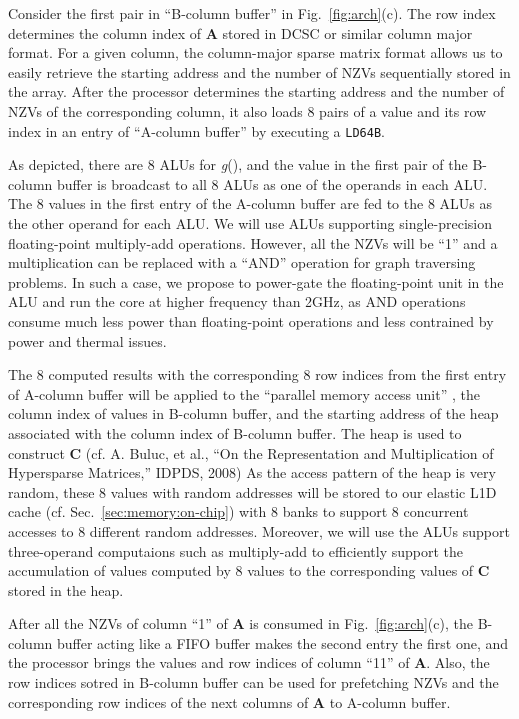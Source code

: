 Consider the first pair in ``B-column buffer'' in Fig.~\ref{fig:arch}(c).
The row index determines the column index of \textbf{A} stored in DCSC or similar column major format.
For a given column, the column-major sparse matrix format allows us to easily retrieve the starting address and the number of NZVs sequentially stored in the array. 
After the processor determines the starting address and the number of NZVs of the corresponding column, 
it also loads 8 pairs of a value and its row index in an entry of ``A-column buffer'' by executing a \texttt{LD64B}.


As depicted, there are 8 ALUs for \textit{g}(), and the value in the first pair of the B-column buffer is broadcast to all 8 ALUs as one of the operands in each ALU.
The 8 values in the first entry of the A-column buffer are fed to the 8 ALUs as the other operand for each ALU.
We will use ALUs supporting single-precision floating-point multiply-add operations.
However, all the NZVs will be ``1'' and a multiplication can be replaced with a ``AND'' operation for graph traversing problems.
In such a case, we propose to power-gate the floating-point unit in the ALU and run the core at higher frequency than 2GHz, as
AND operations consume much less power than floating-point operations and less contrained by power and thermal issues. 


The 8 computed results with the corresponding 8 row indices from the first entry of A-column buffer will be applied to 
the ``parallel memory access unit'' 
,
the column index of values in B-column buffer, and the starting address of the heap associated with the column index of B-column buffer.
The heap is used to construct \textbf{C} (cf. A. Buluc, et al., ``On the Representation and Multiplication of Hypersparse Matrices,'' IDPDS, 2008)
As the access pattern of the heap is very random, these 8 values with random addresses will be stored to our elastic L1D cache (cf. Sec.~\ref{sec:memory:on-chip}) with 8 banks to support 8 concurrent accesses to 8 different random addresses.
Moreover, we will use the ALUs support three-operand computaions such as multiply-add to efficiently support the accumulation of values computed by 8 values to the corresponding values of \textbf{C} stored in the heap.


After all the NZVs of column ``1'' of \textbf{A} is consumed in Fig.~\ref{fig:arch}(c), 
the B-column buffer acting like a FIFO buffer makes the second entry the first one, and the processor brings the values and row indices of column ``11'' of \textbf{A}. 
Also, the row indices sotred in B-column buffer can be used for prefetching NZVs and the corresponding row indices of the next columns of \textbf{A} to A-column buffer.



